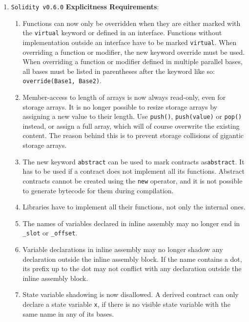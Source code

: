\begin{enumerate}
\item \verb|Solidity v0.6.0| \textbf{Explicitness Requirements}:
    \begin{enumerate}
	\item Functions can now only be overridden when they are either marked with the \verb|virtual| keyword or defined in an interface. Functions without implementation outside an interface have to be marked \verb|virtual|. When overriding a function or modifier, the new keyword override must be used. When overriding a function or modifier defined in multiple parallel bases, all bases must be listed in parentheses after the keyword like so: \verb|override(Base1, Base2)|.
	\item Member-access to length of arrays is now always read-only, even for storage arrays. It is no longer possible to resize storage arrays by assigning a new value to their length. Use \verb|push()|, \verb|push(value)| or \verb|pop()| instead, or assign a full array, which will of course overwrite the existing content. The reason behind this is to prevent storage collisions of gigantic storage arrays.
	\item The new keyword \verb|abstract| can be used to mark contracts as\linebreak\verb|abstract|. It has to be used if a contract does not implement all its functions. Abstract contracts cannot be created using the \verb|new| operator, and it is not possible to generate bytecode for them during compilation.
	\item Libraries have to implement all their functions, not only the internal ones.
	\item The names of variables declared in inline assembly may no longer end in \verb|_slot| or \verb|_offset|.
	\item Variable declarations in inline assembly may no longer shadow any declaration outside the inline assembly block. If the name contains a dot, its prefix up to the dot may not conflict with any declaration outside the inline assembly block.
	\item State variable shadowing is now disallowed. A derived contract can only declare a state variable \verb|x|, if there is no visible state variable with the same name in any of its bases.
    \end{enumerate}


\end{enumerate}
